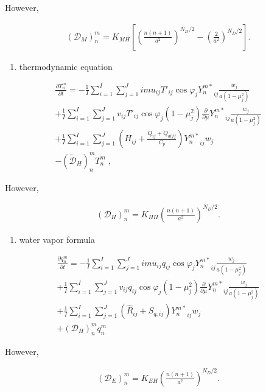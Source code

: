 However,

\begin{eqnarray}
({\mathcal D}_M)_n^m = K_{MH} \left[
                            \left( \frac{n(n+1)}{a^{2}} \right)^{N_D/2}
                            - \left( \frac{2}{a^2} \right)^{N_D/2}
                            \right]  .
\end{eqnarray}

\begin{enumerate}
\def\labelenumi{\arabic{enumi}.}
\setcounter{enumi}{2}
\tightlist
\item
  thermodynamic equation
\end{enumerate}

\begin{eqnarray}
  \frac{\partial T_n^m}{\partial t}
   =  - \frac{1}{I} \sum_{i=1}^{I} \sum_{j=1}^{J}  
          im u_{ij} T'_{ij} \cos\varphi_j
          {Y_n^{m *}}_{ij}
         \frac{w_j}{a(1-\mu_j^{2})}
          \\
     + \frac{1}{I} \sum_{i=1}^{I} \sum_{j=1}^{J}  
          v_{ij} T'_{ij} \cos\varphi_j
          (1-\mu_j^2)
          \frac{\partial }{\partial \mu} {Y_n^{m *}}_{ij}
          \frac{w_j}{a(1-\mu_j^{2})}
          \\
     + \frac{1}{I} \sum_{i=1}^{I} \sum_{j=1}^{J}  
          \left( H_{ij} + \frac{Q_{ij}+Q_{diff}}{C_{p}} \right)
          {Y_n^{m *}}_{ij} w_j
          \\
     - (\tilde{\mathcal D}_H)_n^m T_n^m \; ,
\end{eqnarray}

However,

\begin{eqnarray}
({\mathcal D}_H)_n^m
   =  K_{HH} \left( \frac{n(n+1)}{a^{2}} \right)^{N_D/2} .
\end{eqnarray}

\begin{enumerate}
\def\labelenumi{\arabic{enumi}.}
\setcounter{enumi}{3}
\tightlist
\item
  water vapor formula
\end{enumerate}

\begin{eqnarray}
  \frac{\partial q_n^m}{\partial t}
   =  - \frac{1}{I} \sum_{i=1}^{I} \sum_{j=1}^{J}  
          im u_{ij} q_{ij} \cos\varphi_j
          {Y_n^{m *}}_{ij} \frac{w_j}{a(1-\mu_j^{2})}
          \\
     + \frac{1}{I} \sum_{i=1}^{I} \sum_{j=1}^{J}  
          v_{ij} q_{ij} \cos\varphi_j
          (1-\mu_j^2)
          \frac{\partial }{\partial \mu} {Y_n^{m *}}_{ij}
          \frac{w_j}{a(1-\mu_j^{2})}
          \\
     + \frac{1}{I} \sum_{i=1}^{I} \sum_{j=1}^{J}  
          \left( \hat{R}_{ij} + S_{q,ij} \right)
          {Y_n^{m *}}_{ij} w_j
          \\
     + ({\mathcal D}_H)_n^m q_n^m
\end{eqnarray}

However,

\begin{eqnarray}
({\mathcal D}_E)_n^m
   =  K_{EH} \left( \frac{n(n+1)}{a^{2}} \right)^{N_D/2} .
\end{eqnarray}
